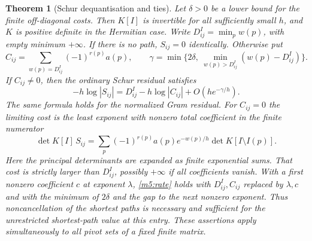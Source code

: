 \documentclass[11pt,reqno]{amsart}
\newtheorem{theorem}{Theorem}[section]
\theoremstyle{definition}
\theoremstyle{remark}
\numberwithin{equation}{section}
\begin{document}
\begin{theorem}[Schur dequantisation and ties]\label{m5:tropical}
Let \(\delta>0\) be a lower bound for the finite off-diagonal costs.
Then \(K[I]\) is invertible for all sufficiently small \(h\), and \(K\)
is positive definite in the Hermitian case. Write
\(D^I_{ij}=\min_p w(p)\), with empty minimum \(+\infty\).
If there is no path, \(S_{ij}=0\) identically. Otherwise put
\[
 C_{ij}=\sum_{w(p)=D^I_{ij}}(-1)^{r(p)}a(p),\qquad
 \gamma=\min\{2\delta,\ \min_{w(p)>D^I_{ij}}(w(p)-D^I_{ij})\}.
\]
If \(C_{ij}\ne0\), then the ordinary Schur residual satisfies
\begin{equation}\label{m5:rate}
 -h\log|S_{ij}|=D^I_{ij}-h\log|C_{ij}|+O(h e^{-\gamma/h}).
\end{equation}
The same formula holds for the normalized Gram residual. For \(C_{ij}=0\)
the limiting cost is the least exponent with nonzero total coefficient
in the finite numerator
\begin{equation}\label{m5:sum}
 \det K[I]\,S_{ij}
 =\sum_p (-1)^{r(p)}a(p)e^{-w(p)/h}\det K[I\setminus I(p)].
\end{equation}
Here the principal determinants are expanded as finite exponential sums.
That cost is strictly larger than \(D^I_{ij}\), possibly \(+\infty\)
if all coefficients vanish. With a first nonzero coefficient \(c\)
at exponent \(\lambda\), \eqref{m5:rate} holds with \(D^I_{ij},C_{ij}\)
replaced by \(\lambda,c\) and with the minimum of \(2\delta\) and
the gap to the next nonzero exponent. Thus noncancellation of the
shortest paths is necessary and sufficient for the unrestricted
shortest-path value at this entry. These assertions apply simultaneously
to all pivot sets of a fixed finite matrix.
\end{theorem}
\end{document}
